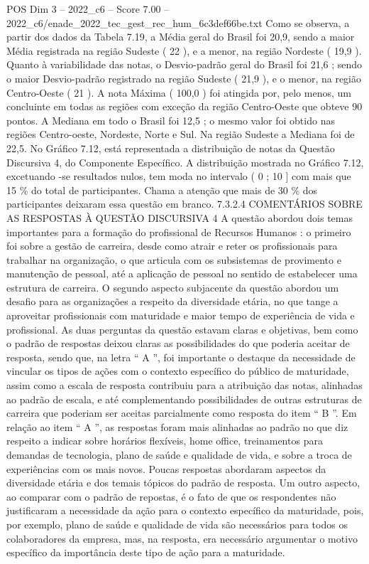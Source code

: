 \begin{textsample}{POS Dim 3 – 2022\_c6 – Score 7.00 – 2022\_c6/enade\_2022\_tec\_gest\_rec\_hum\_6c3def66be.txt}
Como se observa, a partir dos dados da Tabela 7.19, a Média geral do Brasil foi 20,9, sendo a maior Média registrada na região Sudeste ( 22 ), e a menor, na região Nordeste ( 19,9 ).
Quanto à variabilidade das notas, o Desvio-padrão geral do Brasil foi 21,6 ; sendo o maior Desvio-padrão registrado na região Sudeste ( 21,9 ), e o menor, na região Centro-Oeste ( 21 ).
A nota Máxima ( 100,0 ) foi atingida por, pelo menos, um concluinte em todas as regiões com exceção da região Centro-Oeste que obteve 90 pontos.
A Mediana em todo o Brasil foi 12,5 ; o mesmo valor foi obtido nas regiões Centro-oeste, Nordeste, Norte e Sul.
Na região Sudeste a Mediana foi de 22,5.
No Gráfico 7.12, está representada a distribuição de notas da Questão Discursiva 4, do Componente Específico.
A distribuição mostrada no Gráfico 7.12, excetuando -se resultados nulos, tem moda no intervalo ( 0 ; 10 ] com mais que 15 \% do total de participantes.
Chama a atenção que mais de 30 \% dos participantes deixaram essa questão em branco. 7.3.2.4 COMENTÁRIOS SOBRE AS RESPOSTAS À QUESTÃO DISCURSIVA 4 A questão abordou dois temas importantes para a formação do profissional de Recursos Humanos : o primeiro foi sobre a gestão de carreira, desde como atrair e reter os profissionais para trabalhar na organização, o que articula com os subsistemas de provimento e manutenção de pessoal, até a aplicação de pessoal no sentido de estabelecer uma estrutura de carreira.
O segundo aspecto subjacente da questão abordou um desafio para as organizações a respeito da diversidade etária, no que tange a aproveitar profissionais com maturidade e maior tempo de experiência de vida e profissional.
As duas perguntas da questão estavam claras e objetivas, bem como o padrão de respostas deixou claras as possibilidades do que poderia aceitar de resposta, sendo que, na letra “ A ”, foi importante o destaque da necessidade de vincular os tipos de ações com o contexto específico do público de maturidade, assim como a escala de resposta contribuiu para a atribuição das notas, alinhadas ao padrão de escala, e até complementando possibilidades de outras estruturas de carreira que poderiam ser aceitas parcialmente como resposta do item “ B ”.
Em relação ao item “ A ”, as respostas foram mais alinhadas ao padrão no que diz respeito a indicar sobre horários flexíveis, home office, treinamentos para demandas de tecnologia, plano de saúde e qualidade de vida, e sobre a troca de experiências com os mais novos.
Poucas respostas abordaram aspectos da diversidade etária e dos temais tópicos do padrão de resposta.
Um outro aspecto, ao comparar com o padrão de repostas, é o fato de que os respondentes não justificaram a necessidade da ação para o contexto específico da maturidade, pois, por exemplo, plano de saúde e qualidade de vida são necessários para todos os colaboradores da empresa, mas, na resposta, era necessário argumentar o motivo específico da importância deste tipo de ação para a maturidade.

\end{textsample}
